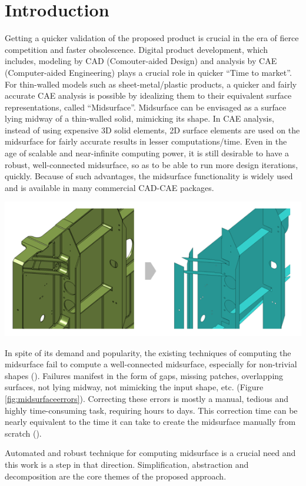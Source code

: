 \section{Introduction}\label{sec:intro}

Getting a quicker validation of the proposed product is crucial in the era of fierce competition and faster obsolescence. Digital product development, which includes, modeling by CAD (Comouter-aided Design)  and analysis by CAE (Computer-aided Engineering) plays a crucial role in quicker ``Time to market''.  For thin-walled models such as sheet-metal/plastic products, a quicker and fairly accurate CAE analysis is possible by idealizing them to their equivalent surface representations, called ``Midsurface''. Midsurface can be envisaged as a surface lying midway of a thin-walled solid, mimicking its shape.   In CAE analysis, instead of using expensive 3D solid elements, 2D surface elements are used on the midsurface for fairly accurate results in lesser computations/time.  Even in the age of scalable and near-infinite computing power, it is still desirable to have  a robust, well-connected midsurface, so as to be able to run more design iterations, quickly.  Because of such advantages, the midsurface functionality is widely used and is available in many commercial CAD-CAE packages. 

\begin{minipage}[h]{\linewidth} 
\begin{minipage}[h]{0.5\linewidth} 
		\centering
		\includegraphics[width=0.9\linewidth]{images/MidsurfaceErrorsMscApex}
		\label{fig:midsurfaceerrors}
\end{minipage}
\hfill
\begin{minipage}[h]{0.5\linewidth} 
In spite of its demand and popularity, the existing techniques of computing the midsurface fail to compute a well-connected midsurface, especially for non-trivial shapes (\cite{Woo2013,Automex}). Failures manifest in the form of gaps, missing patches, overlapping surfaces, not lying midway, not mimicking the input shape, etc. (Figure \ref{fig:midsurfaceerrors}). Correcting these errors is mostly a manual, tedious and highly time-consuming task, requiring hours to days. This correction time can be nearly equivalent to the time it can take to create the midsurface manually from scratch (\cite{Stolt2006}). 
\end{minipage}
\end{minipage}



 Automated and  robust technique for computing midsurface  is a crucial need and this work is a step in that direction. Simplification, abstraction and decomposition are the core themes of the proposed approach.

